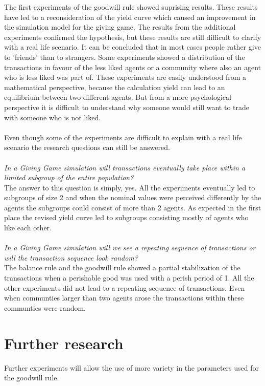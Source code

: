 \documentclass[twoside,openright]{uva-bachelor-thesis}
\begin{document}
The first experiments of the goodwill rule showed suprising results. These results have led to a reconsideration of the yield curve which caused an improvement in the simulation model for the giving game. The results from the additional experiments confirmed the hypothesis, but these results  are still difficult to clarify with a real life scenario. It can be concluded that in most cases people rather give to 'friends' than to strangers. Some experiments showed a distribution of the transactions in favour of the less liked agents or a community where also an agent who is less liked was part of. These experiments are easily understood from a mathematical perspective, because the calculation yield can lead to an equilibrium between two different agents. But from a more psychological perspective it is difficult to understand why someone would still want to trade with someone who is not liked.\\
\\
Even though some of the experiments are difficult to explain with a real life scenario the research questions can still be answered.
\\
\\
\textit{In a Giving Game simulation will transactions eventually take place within a limited subgroup of the entire population?} \\
The answer to this question is simply, yes. All the experiments eventually led to subgroups of size 2 and when the nominal values were perceived differently by the agents the subgroups could consist of more than 2 agents. As expected in the first place the revised yield curve led to subgroups consisting mostly of agents who like each other.
\\
\\
\textit{In a Giving Game simulation will we see a repeating sequence of transactions or will the transaction sequence look random?} \\
The balance rule and the goodwill rule showed a partial stabilization of the transactions when a perishable good was used with a perish period of 1. All the other experiments did not lead to a repeating sequence of transactions. Even when communties larger than two agents arose the transactions within these communties were random.

\section{Further research}
Further experiments will allow the use of more variety in the parameters used for the goodwill rule. 
\end{document}
